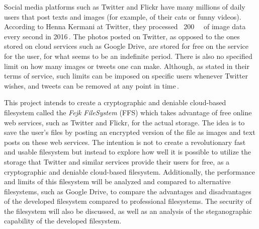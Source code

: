 Social media platforms such as Twitter and Flickr have many millions of daily users that post texts and images (for example, of their cats or funny videos). According to Henna Kermani at Twitter, they processed ~\SI{200}{\giga\byte} of image data every second in 2016\,\cite{MobileScaleLondona}. The photos posted on Twitter, as opposed to the ones stored on cloud services such as Google Drive, are stored for free on the service for the user, for what seems to be an indefinite period. There is also no specified limit on how many images or tweets one can make. Although, as stated in their terms of service, such limits can be imposed on specific users whenever Twitter wishes, and tweets can be removed at any point in time\,\cite{twitterTwitterTermsService2021}.

This project intends to create a cryptographic and deniable cloud-based filesystem called the \textit{Fejk FileSystem} (\gls{FFS}) which takes advantage of free online web services, such as Twitter and Flickr, for the actual storage. The idea is to save the user's files by posting an encrypted version of the file as images and text posts on these web services. The intention is not to create a revolutionary fast and usable filesystem but instead to explore how well it is possible to utilize the storage that Twitter and similar services provide their users for free, as a cryptographic and deniable cloud-based filesystem. Additionally, the performance and limits of this filesystem will be analyzed and compared to alternative filesystems, such as Google Drive, to compare the advantages and disadvantages of the developed filesystem compared to professional filesystems. The security of the filesystem will also be discussed, as well as an analysis of the steganographic capability of the developed filesystem.

%  












